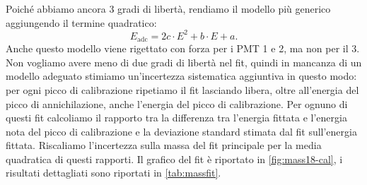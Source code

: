 Poiché abbiamo ancora 3 gradi di libertà,
rendiamo il modello più generico aggiungendo il termine quadratico:
\begin{equation}
	\label{eq:parabola}
	E_\text{adc} = 2c \cdot E^2 + b \cdot E + a.
\end{equation}
Anche questo modello viene rigettato con forza per i PMT 1 e 2, ma non per il 3.
Non vogliamo avere meno di due gradi di libertà nel fit,
quindi in mancanza di un modello adeguato stimiamo un'incertezza sistematica aggiuntiva in questo modo:
per ogni picco di calibrazione ripetiamo il fit lasciando libera,
oltre all'energia del picco di annichilazione,
anche l'energia del picco di calibrazione.
Per ognuno di questi fit calcoliamo il rapporto tra
la differenza tra l'energia fittata e l'energia nota del picco di calibrazione
e la deviazione standard stimata dal fit sull'energia fittata.
Riscaliamo l'incertezza sulla massa del fit principale
per la media quadratica di questi rapporti.
Il grafico del fit è riportato in \autoref{fig:mass18-cal},
i risultati dettagliati sono riportati in \autoref{tab:massfit}.
